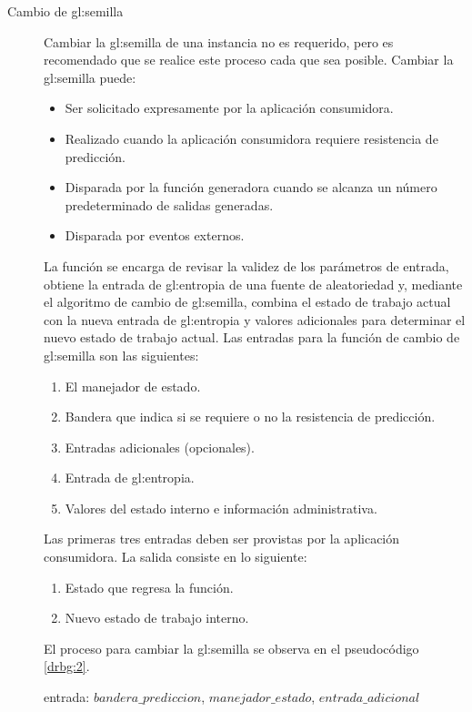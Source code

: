 \begin{description}
  \item [Cambio de \gls{gl:semilla}] Cambiar la \gls{gl:semilla} de una
    instancia no es requerido, pero es recomendado que se realice este proceso
    cada que sea posible. Cambiar la \gls{gl:semilla} puede:
    \begin{itemize}
      \item Ser solicitado expresamente por la aplicación consumidora.
      \item Realizado cuando la aplicación consumidora requiere resistencia de
        predicción.
      \item Disparada por la función generadora cuando se alcanza un número
        predeterminado de salidas generadas.
      \item Disparada por eventos externos.
    \end{itemize}
    La función se encarga de revisar la validez de los parámetros de entrada,
    obtiene la entrada de \gls{gl:entropia} de una fuente de aleatoriedad y,
    mediante el algoritmo de cambio de \gls{gl:semilla}, combina el estado de
    trabajo actual con la nueva entrada de \gls{gl:entropia} y valores
    adicionales para determinar el nuevo estado de trabajo actual. Las entradas
    para la función de cambio de \gls{gl:semilla} son las siguientes:
    \begin{enumerate}
      \item El manejador de estado.
      \item Bandera que indica si se requiere o no la resistencia de predicción.
      \item Entradas adicionales (opcionales).
      \item Entrada de \gls{gl:entropia}.
      \item Valores del estado interno e información administrativa.
    \end{enumerate}
    Las primeras tres entradas deben ser provistas por la aplicación
    consumidora. La salida consiste en lo siguiente:
    \begin{enumerate}
      \item Estado que regresa la función.
      \item Nuevo estado de trabajo interno.
    \end{enumerate}
    El proceso para cambiar la \gls{gl:semilla} se observa en el pseudocódigo
    \ref{drbg:2}.
\begin{pseudocodigo}[caption={DRBG, cambio de semilla.}, label={drbg:2}]
    entrada:  $bandera\_prediccion$, $manejador\_estado$, $entrada\_adicional$

\end{pseudocodigo}
\end{description}

